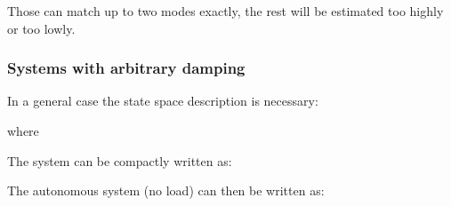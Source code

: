 \documentclass[10pt,a4paper]{scrartcl}
\begin{document}
\begin{multicols*}{2}

Those can match up to two modes exactly, the rest will be estimated too highly or too lowly.

\subsubsection{Systems with arbitrary damping}

In a general case the state space description is necessary:


where


The system can be compactly written as:


The autonomous system (no load) can then be written as:


\end{multicols*}
\end{document}
